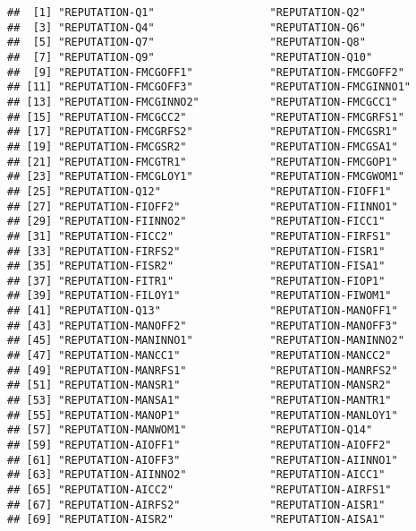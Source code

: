 \documentclass[
]{article}
\begin{document}
\begin{verbatim}
##  [1] "REPUTATION-Q1"                  "REPUTATION-Q2"                 
##  [3] "REPUTATION-Q4"                  "REPUTATION-Q6"                 
##  [5] "REPUTATION-Q7"                  "REPUTATION-Q8"                 
##  [7] "REPUTATION-Q9"                  "REPUTATION-Q10"                
##  [9] "REPUTATION-FMCGOFF1"            "REPUTATION-FMCGOFF2"           
## [11] "REPUTATION-FMCGOFF3"            "REPUTATION-FMCGINNO1"          
## [13] "REPUTATION-FMCGINNO2"           "REPUTATION-FMCGCC1"            
## [15] "REPUTATION-FMCGCC2"             "REPUTATION-FMCGRFS1"           
## [17] "REPUTATION-FMCGRFS2"            "REPUTATION-FMCGSR1"            
## [19] "REPUTATION-FMCGSR2"             "REPUTATION-FMCGSA1"            
## [21] "REPUTATION-FMCGTR1"             "REPUTATION-FMCGOP1"            
## [23] "REPUTATION-FMCGLOY1"            "REPUTATION-FMCGWOM1"           
## [25] "REPUTATION-Q12"                 "REPUTATION-FIOFF1"             
## [27] "REPUTATION-FIOFF2"              "REPUTATION-FIINNO1"            
## [29] "REPUTATION-FIINNO2"             "REPUTATION-FICC1"              
## [31] "REPUTATION-FICC2"               "REPUTATION-FIRFS1"             
## [33] "REPUTATION-FIRFS2"              "REPUTATION-FISR1"              
## [35] "REPUTATION-FISR2"               "REPUTATION-FISA1"              
## [37] "REPUTATION-FITR1"               "REPUTATION-FIOP1"              
## [39] "REPUTATION-FILOY1"              "REPUTATION-FIWOM1"             
## [41] "REPUTATION-Q13"                 "REPUTATION-MANOFF1"            
## [43] "REPUTATION-MANOFF2"             "REPUTATION-MANOFF3"            
## [45] "REPUTATION-MANINNO1"            "REPUTATION-MANINNO2"           
## [47] "REPUTATION-MANCC1"              "REPUTATION-MANCC2"             
## [49] "REPUTATION-MANRFS1"             "REPUTATION-MANRFS2"            
## [51] "REPUTATION-MANSR1"              "REPUTATION-MANSR2"             
## [53] "REPUTATION-MANSA1"              "REPUTATION-MANTR1"             
## [55] "REPUTATION-MANOP1"              "REPUTATION-MANLOY1"            
## [57] "REPUTATION-MANWOM1"             "REPUTATION-Q14"                
## [59] "REPUTATION-AIOFF1"              "REPUTATION-AIOFF2"             
## [61] "REPUTATION-AIOFF3"              "REPUTATION-AIINNO1"            
## [63] "REPUTATION-AIINNO2"             "REPUTATION-AICC1"              
## [65] "REPUTATION-AICC2"               "REPUTATION-AIRFS1"             
## [67] "REPUTATION-AIRFS2"              "REPUTATION-AISR1"              
## [69] "REPUTATION-AISR2"               "REPUTATION-AISA1"              

\end{verbatim}
\end{document}
